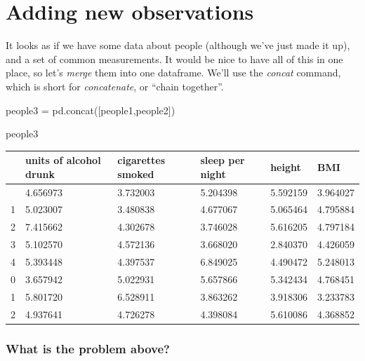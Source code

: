 \documentclass[
  letterpaper,
  DIV=11,
  numbers=noendperiod]{scrreprt}
\newenvironment{Shaded}{\begin{snugshade}}{\end{snugshade}}
\newcommand{\NormalTok}[1]{\textcolor[rgb]{0.00,0.23,0.31}{#1}}
\newcommand{\OperatorTok}[1]{\textcolor[rgb]{0.37,0.37,0.37}{#1}}
\begin{document}

\hypertarget{adding-new-observations}{%
\chapter{Adding new observations}\label{adding-new-observations}}

It looks as if we have some data about people (although we've just made
it up), and a set of common measurements. It would be nice to have all
of this in one place, so let's \emph{merge} them into one dataframe.
We'll use the \emph{concat} command, which is short for
\emph{concatenate}, or ``chain together''.

\begin{Shaded}
\begin{Highlighting}[]
\NormalTok{people3 }\OperatorTok{=}\NormalTok{ pd.concat([people1,people2])}
\end{Highlighting}
\end{Shaded}

\begin{Shaded}
\begin{Highlighting}[]
\NormalTok{people3}
\end{Highlighting}
\end{Shaded}

\begin{longtable}[]{@{}llllll@{}}
\toprule\noalign{}
& units of alcohol drunk & cigarettes smoked & sleep per night & height
& BMI \\
\midrule\noalign{}
\endhead
\bottomrule\noalign{}
\endlastfoot
0 & 4.656973 & 3.732003 & 5.204398 & 5.592159 & 3.964027 \\
1 & 5.023007 & 3.480838 & 4.677067 & 5.065464 & 4.795884 \\
2 & 7.415662 & 4.302678 & 3.746028 & 5.616205 & 4.797184 \\
3 & 5.102570 & 4.572136 & 3.668020 & 2.840370 & 4.426059 \\
4 & 5.393448 & 4.397537 & 6.849025 & 4.490472 & 5.248013 \\
0 & 3.657942 & 5.022931 & 5.657866 & 5.342434 & 4.768451 \\
1 & 5.801720 & 6.528911 & 3.863262 & 3.918306 & 3.233783 \\
2 & 4.937641 & 4.726278 & 4.398084 & 5.610086 & 4.368852 \\
\end{longtable}

\hypertarget{what-is-the-problem-above}{%
\subsection{What is the problem
above?}\label{what-is-the-problem-above}}
\end{document}
